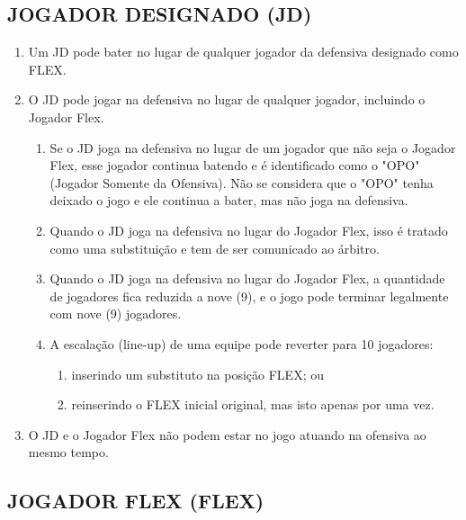 \subsection{JOGADOR DESIGNADO (JD)}
\begin{enumerate}[label=(\alph*)]
	\item Um JD pode bater no lugar de qualquer jogador da defensiva designado como FLEX.
 	\item O JD pode jogar na defensiva no lugar de qualquer jogador, incluindo o Jogador Flex.
	  \begin{enumerate}[label=\roman*.]
		\item  Se o JD joga na defensiva no lugar de um jogador que não seja o Jogador Flex, esse jogador continua batendo e é identificado como o "OPO" (Jogador Somente da Ofensiva). Não se considera que o "OPO" tenha deixado o jogo e ele continua a bater, mas não joga na defensiva.
		\item Quando o JD joga na defensiva no lugar do Jogador Flex, isso é tratado como uma substituição e tem de ser comunicado ao árbitro.
		\item Quando o JD joga na defensiva no lugar do Jogador Flex, a quantidade de jogadores fica reduzida a nove (9), e o jogo pode terminar legalmente com nove (9) jogadores.
		\item A escalação (\gls{line-up}) de uma equipe pode reverter para 10 jogadores:
	 	\begin{enumerate}[label=\arabic*)]
			\item  inserindo um substituto na posição FLEX; ou
			\item reinserindo o FLEX inicial original, mas isto apenas por uma vez.
		\end{enumerate}
	\end{enumerate}
 	\item O JD e o Jogador Flex não podem estar no jogo atuando na ofensiva ao mesmo tempo.
\end{enumerate}

\subsection{JOGADOR FLEX (FLEX)}

